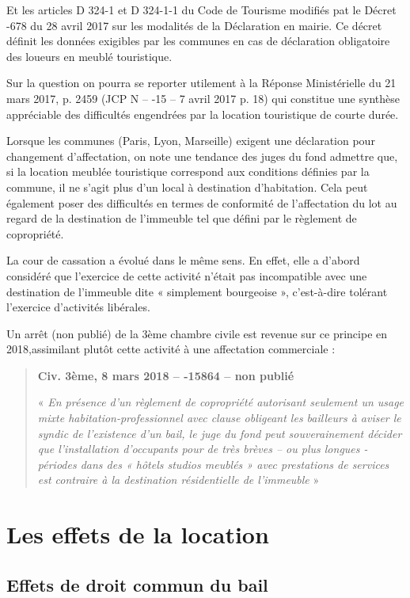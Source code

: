 		Et les articles D 324-1 et D 324-1-1 du Code de Tourisme modifiés pat le Décret -678 du 28 avril 2017 sur les modalités de la Déclaration en mairie. Ce décret définit les données exigibles par les communes en cas de déclaration obligatoire des loueurs en meublé touristique.
		
		Sur la question on pourra se reporter utilement à la Réponse Ministérielle  du 21 mars 2017, p. 2459 (JCP N – -15 – 7 avril 2017 p. 18) qui constitue une synthèse appréciable des difficultés engendrées par la location touristique de courte durée.
		
		Lorsque les communes (Paris, Lyon, Marseille) exigent une déclaration pour changement d'affectation, on note une tendance des juges du fond admettre que, si la location meublée touristique correspond aux conditions définies par la commune, il ne s'agit plus d'un local à destination d'habitation. Cela peut également poser des difficultés en termes de conformité de l'affectation du lot au regard de la destination de l'immeuble tel que défini par le règlement de copropriété.
		
		La cour de cassation a évolué dans le même sens. En effet, elle a d’abord considéré que l’exercice de cette activité n’était pas incompatible avec une destination de l’immeuble dite « simplement bourgeoise », c’est-à-dire tolérant l’exercice d’activités libérales.

		Un arrêt (non publié) de la 3ème chambre civile est revenue sur ce principe en 2018,assimilant plutôt cette activité à une affectation commerciale :
		\begin{quote}
			\textbf{Civ. 3ème, 8 mars 2018 – -15864 – non publié}
			
			« {\itshape En présence d’un règlement de copropriété autorisant seulement un usage mixte habitation-professionnel avec clause obligeant les bailleurs à aviser le syndic de l’existence d’un bail, le juge du fond peut souverainement décider que l’installation d’occupants pour de très brèves – ou plus longues - périodes dans des « hôtels studios meublés » avec prestations de services est contraire à la destination résidentielle de l’immeuble} »
		\end{quote}
	
\section{Les effets de la location}
	
	\subsection{Effets de droit commun du bail}
	
